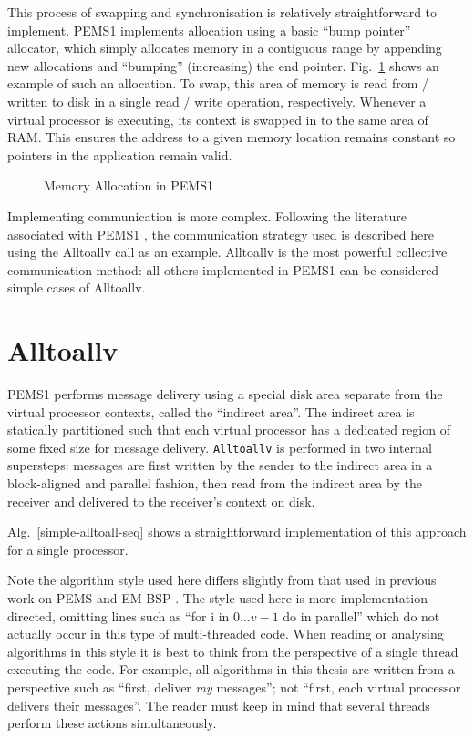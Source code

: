 \documentclass[12pt]{carletoncsthesis}
\begin{document}
This process of swapping and synchronisation is relatively straightforward
to implement.  PEMS1 implements allocation using a basic ``bump pointer''
allocator, which simply allocates memory in a contiguous range by appending
new allocations and ``bumping'' (increasing) the end pointer.
 Fig.~\ref{allocation-fig} shows an example of such an allocation.
To swap, this area of memory is read from / written to disk in a single read
/ write operation, respectively.  Whenever a virtual processor is executing,
its context is swapped in to the same area of RAM.  This ensures the address
to a given memory location remains constant so pointers in the application
remain valid.

\begin{figure}[h]
\begin{center}
\end{center}
\caption{Memory Allocation in PEMS1}
\label{allocation-fig}
\end{figure}

Implementing communication is more complex.  Following the literature
associated with PEMS1 \cite{mnthesis}\cite{experimentswith}, the communication
strategy used is described here using the {\sc Alltoallv} call as an example.
{\sc Alltoallv} is the most powerful collective communication method:
all others implemented in PEMS1 can be considered simple cases of
{\sc Alltoallv}.

\section{Alltoallv}


PEMS1 performs message delivery using a special disk area separate from the
virtual processor contexts, called the ``indirect area''.  The indirect area
is statically partitioned such that each virtual processor has a dedicated
region of some fixed size for message delivery.  {\tt Alltoallv} is performed
in two internal supersteps: messages are first written by the sender to the
indirect area in a block-aligned and parallel fashion, then read from the
indirect area by the receiver and delivered to the receiver's context on disk.

Alg.~\ref{simple-alltoall-seq} shows a straightforward implementation of this
approach for a single processor.

Note the algorithm style used here differs slightly from
that used in previous work on PEMS \cite{mnthesis} and EM-BSP
\cite{dhthesis}\cite{bspem}\cite{emsimulation}.  The style used here is more
implementation directed, omitting lines such as ``for i in $0{\dots}v-1$ do in
parallel'' which do not actually occur in this type of multi-threaded code.
When reading or analysing algorithms in this style it is best to think from
the perspective of a single thread executing the code.  For example, all
algorithms in this thesis are written from a perspective such as ``first,
deliver {\em my} messages''; not ``first, each virtual processor delivers
their messages''.  The reader must keep in mind that several threads perform
these actions simultaneously.
\end{document}
